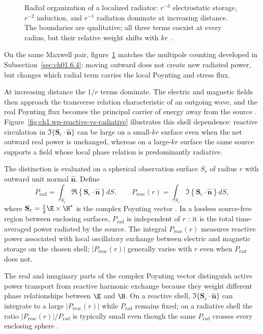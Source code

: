 \begin{figure}[t]
\centering
\VolIPhysFig{\VolIPhysRadialFieldZones}
\caption{Radial organization of a localized radiator: $r^{-3}$ electrostatic storage, $r^{-2}$ induction, and $r^{-1}$ radiation dominate at increasing distance. The boundaries are qualitative; all three terms coexist at every radius, but their relative weight shifts with $kr$ \cite{stratton1941,poynting1884}.}
\label{fig:ch1.radial-field-zones}
\end{figure}

On the same Maxwell pair, figure~\ref{fig:ch1.radial-field-zones} matches the multipole counting developed in Subsection~\ref{sec:ch01.6.4}: moving outward does not create new radiated power, but changes which radial term carries the local Poynting and stress flux.

At increasing distance the $1/r$ terms dominate. The electric and magnetic fields then approach the transverse relation characteristic of an outgoing wave, and the real Poynting flux becomes the principal carrier of energy away from the source \cite{poynting1884}. Figure~\ref{fig:ch1.wp-reactive-vs-radiative} illustrates this shell dependence: reactive circulation in $\Im\{\mathbf{S}_\mathrm{c}\cdot\hat{\mathbf{n}}\}$ can be large on a small-$kr$ surface even when the net outward real power is unchanged, whereas on a large-$kr$ surface the same source supports a field whose local phase relation is predominantly radiative.

The distinction is evaluated on a spherical observation surface $S_r$ of radius $r$ with outward unit normal $\hat{\mathbf{n}}$. Define
\begin{equation}
\label{eq:ch1.ex64-power-functionals}
P_{\mathrm{rad}}=\int_{S_r}\Re\!\left\{\mathbf{S}_\mathrm{c}\cdot\hat{\mathbf{n}}\right\}dS,\qquad
P_{\mathrm{reac}}(r)=\int_{S_r}\Im\!\left\{\mathbf{S}_\mathrm{c}\cdot\hat{\mathbf{n}}\right\}dS,
\end{equation}
where \(\mathbf{S}_\mathrm{c}=\tfrac{1}{2}\E\times\H^*\) is the complex Poynting vector
\cite{poynting1884}. In a lossless source-free region between enclosing surfaces, $P_{\mathrm{rad}}$ is independent of $r$ \cite{stratton1941}: it is the total time-averaged power radiated by the source. The integral $P_{\mathrm{reac}}(r)$ measures reactive power associated with local oscillatory exchange between electric and magnetic storage on the chosen shell; $|P_{\mathrm{reac}}(r)|$ generally varies with $r$ even when $P_{\mathrm{rad}}$ does not.

The real and imaginary parts of the complex Poynting vector distinguish active power transport from reactive harmonic exchange because they weight different phase relationships between \(\E\) and \(\H\). On a reactive shell, \(\Im\{\mathbf{S}_\mathrm{c}\cdot\hat{\mathbf{n}}\}\) can integrate to a large \(|P_{\mathrm{reac}}(r)|\) while \(P_{\mathrm{rad}}\) remains fixed; on a radiative shell the ratio \(|P_{\mathrm{reac}}(r)|/P_{\mathrm{rad}}\) is typically small even though the same $P_{\mathrm{rad}}$ crosses every enclosing sphere \cite{poynting1884,stratton1941}.

